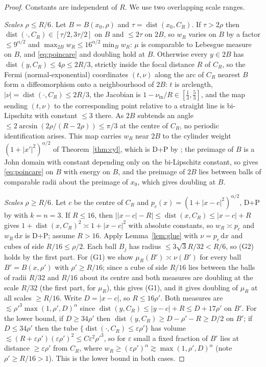 \documentclass[11pt]{amsart}
\newcommand{\dd}{\,\mathrm{d}}
\newcommand{\abs}[1]{\lvert #1\rvert}
\DeclareMathOperator{\dist}{dist}
\theoremstyle{plain}
\theoremstyle{definition}
\theoremstyle{remark}
\begin{document}
\begin{proof}
Constants are independent of $R$. We use two overlapping scale ranges.

\emph{Scales $\rho\le R/6$.} Let $B=B(x_0,\rho)$ and $\tau=\dist(x_0,C_R)$. If
$\tau>2\rho$ then $\dist(\cdot,C_R)\in[\tau/2,3\tau/2]$ on $B$ and $\le2\tau$ on
$2B$, so $w_R$ varies on $B$ by a factor $\le9^{\alpha/2}$ and $\max_{2B}w_R\le
16^{\alpha/2}\min_Bw_R$: $\mu$ is comparable to Lebesgue measure on $B$, and
\eqref{eq:poincare} and doubling hold at $B$. Otherwise every $y\in2B$ has
$\dist(y,C_R)\le4\rho\le2R/3$, strictly inside the focal distance $R$ of $C_R$,
so the Fermi (normal-exponential) coordinates $(t,\nu)$ along the arc of $C_R$
nearest $B$ form a diffeomorphism onto a neighbourhood of $2B$: $t$ is
arclength, $\abs\nu=\dist(\cdot,C_R)\le2R/3$, the Jacobian is
$1-\nu_{\mathrm{in}}/R\in[\tfrac13,\tfrac53]$, and the map sending $(t,\nu)$ to
the corresponding point relative to a straight line is bi-Lipschitz with
constant $\le3$ there. As $2B$ subtends an angle $\le2\arcsin(2\rho/(R-2\rho))
\le\pi/3$ at the centre of $C_R$, no periodic identification arises. This map
carries $w_R$ near $2B$ to the cylinder weight $(1+\abs{x'}^2)^{\alpha/2}$ of
Theorem~\ref{thm:cyl}, which is D+P by \cite[Prop.~6]{bjorn2001}; the preimage
of $B$ is a John domain with constant depending only on the bi-Lipschitz
constant, so \cite[Thm.~9.7]{hajlaszkoskela2000} gives \eqref{eq:poincare} on
$B$ with energy on $B$, and the preimage of $2B$ lies between balls of
comparable radii about the preimage of $x_0$, which gives doubling at $B$.

\emph{Scales $\rho\ge R/6$.} Let $c$ be the centre of $C_R$ and
$p_c(x)=(1+\abs{x-c}^2)^{\alpha/2}$, D+P by \cite[Prop.~6]{bjorn2001} with
$k=n=3$. If $R\le16$, then $\abs{\abs{x-c}-R}\le\dist(x,C_R)\le\abs{x-c}+R$ gives
$1+\dist(x,C_R)^2\asymp1+\abs{x-c}^2$ with absolute constants, so $w_R\asymp p_c$
and $w_R\dd x$ is D+P; assume $R>16$. Apply Lemma~\ref{lem:glue} with
$\nu=p_c\dd x$ and cubes of side $R/16\le\rho/2$. Each ball $B_j$ has radius
$\le3\sqrt3R/32<R/6$, so (G2) holds by the first part. For (G1) we show
$\mu_R(B')\asymp\nu(B')$ for every ball $B'=B(x,\rho')$ with $\rho'\ge R/16$;
since a cube of side $R/16$ lies between the balls of radii $R/32$ and $R/16$
about its centre and both measures are doubling at the scale $R/32$ (the first
part, for $\mu_R$), this gives (G1), and it gives doubling of $\mu_R$ at all
scales $\ge R/16$. Write $D=\abs{x-c}$, so $R\le16\rho'$. Both measures are
$\lesssim\rho'^3\max(1,\rho',D)^\alpha$ since $\dist(y,C_R)\le\abs{y-c}+R\le
D+17\rho'$ on $B'$. For the lower bound, if $D\ge34\rho'$ then
$\dist(y,C_R)\ge D-\rho'-R\ge D/2$ on $B'$; if $D\le34\rho'$ then the tube
$\{\dist(\cdot,C_R)\le\varepsilon\rho'\}$ has volume $\lesssim(R+\varepsilon
\rho')(\varepsilon\rho')^2\le C\varepsilon^2\rho'^3$, so for $\varepsilon$ small
a fixed fraction of $B'$ lies at distance $\ge\varepsilon\rho'$ from $C_R$, where
$w_R\ge(\varepsilon\rho')^\alpha\gtrsim\max(1,\rho',D)^\alpha$ (note
$\rho'\ge R/16>1$). This is the lower bound in both cases.
\end{proof}
\end{document}
